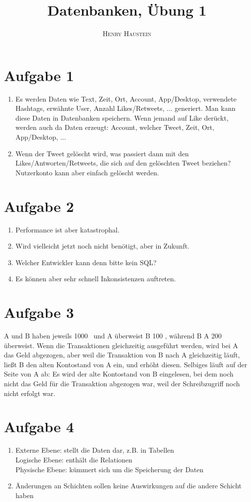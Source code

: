 \documentclass{article}
\title{\textbf{Datenbanken, Übung 1}}
\author{\textsc{Henry Haustein}}
\date{}
\begin{document}
	\maketitle
	
	\section*{Aufgabe 1}
	\begin{enumerate}[label=(\alph*)]
		\item Es werden Daten wie Text, Zeit, Ort, Account, App/Desktop, verwendete Hashtags, erwähnte User, Anzahl Likes/Retweets, ... generiert. Man kann diese Daten in Datenbanken speichern. Wenn jemand auf Like derückt, werden auch da Daten erzeugt: Account, welcher Tweet, Zeit, Ort, App/Desktop, ... 
		\item Wenn der Tweet gelöscht wird, was passiert dann mit den Likes/Antworten/Retweets, die sich auf den gelöschten Tweet beziehen? Nutzerkonto kann aber einfach gelöscht werden.
	\end{enumerate}

	\section*{Aufgabe 2}
	\begin{enumerate}[label=(\alph*)]
		\item Performance ist aber katastrophal.
		\item Wird vielleicht jetzt noch nicht benötigt, aber in Zukunft.
		\item Welcher Entwickler kann denn bitte kein SQL?
		\item Es können aber sehr schnell Inkonsistenzen auftreten.
	\end{enumerate}

	\section*{Aufgabe 3}
	A und B haben jeweils 1000 \EUR\, und A überweist B 100 \EUR, während B A 200 \EUR\, überweist. Wenn die Transaktionen gleichzeitig ausgeführt werden, wird bei A das Geld abgezogen, aber weil die Transaktion von B nach A gleichzeitig läuft, ließt B den alten Kontostand von A ein, und erhöht diesen. Selbiges läuft auf der Seite von A ab: Es wird der alte Kontostand von B eingelesen, bei dem noch nicht das Geld für die Transaktion abgezogen war, weil der Schreibzugriff noch nicht erfolgt war.
	
	\section*{Aufgabe 4}
	\begin{enumerate}[label=(\alph*)]
		\item Externe Ebene: stellt die Daten dar, z.B. in Tabellen \\
		Logische Ebene: enthält die Relationen \\
		Physische Ebene: kümmert sich um die Speicherung der Daten
		\item Änderungen an Schichten sollen keine Auswirkungen auf die andere Schicht haben
	\end{enumerate}
	
\end{document}
